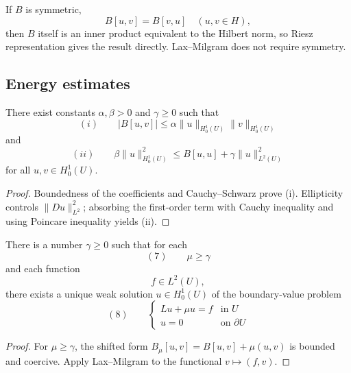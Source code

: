 \begin{remark}
\label{rem:lax-milgram-symmetric-case}

If $B$ is symmetric,
$$B[u,v] = B[v,u] \quad (u,v \in H),$$
then $B$ itself is an inner product equivalent to the Hilbert norm, so Riesz representation gives the result directly. Lax--Milgram does not require symmetry.
\end{remark}

\subsection{Energy estimates}

\begin{theorem}
\label{thm:energy-estimates}

There exist constants $\alpha,\beta > 0$ and $\gamma \geq 0$ such that
$$(i) \qquad |B[u,v]| \leq \alpha\|u\|_{H_0^1(U)}\|v\|_{H_0^1(U)}$$
and
$$(ii) \qquad \beta\|u\|_{H_0^1(U)}^2 \leq B[u,u] + \gamma\|u\|_{L^2(U)}^2$$
for all $u,v \in H_0^1(U)$.
\end{theorem}

\begin{proof}
\sketch Boundedness of the coefficients and Cauchy--Schwarz prove (i). Ellipticity controls $\|Du\|_{L^2}^2$; absorbing the first-order term with Cauchy inequality and using Poincare inequality yields (ii).
\end{proof}

\begin{theorem}
\label{thm:first-existence-weak-solutions}

There is a number $\gamma \geq 0$ such that for each
$$(7) \qquad \mu \geq \gamma$$
and each function
$$f \in L^2(U),$$
there exists a unique weak solution $u \in H_0^1(U)$ of the boundary-value problem
$$(8) \qquad \begin{cases} Lu + \mu u = f & \text{in } U \\ u = 0 & \text{on } \partial U \end{cases}$$
\end{theorem}

\begin{proof}
\sketch For $\mu\ge\gamma$, the shifted form $B_\mu[u,v]=B[u,v]+\mu(u,v)$ is bounded and coercive. Apply Lax--Milgram to the functional $v\mapsto(f,v)$.
\end{proof}

